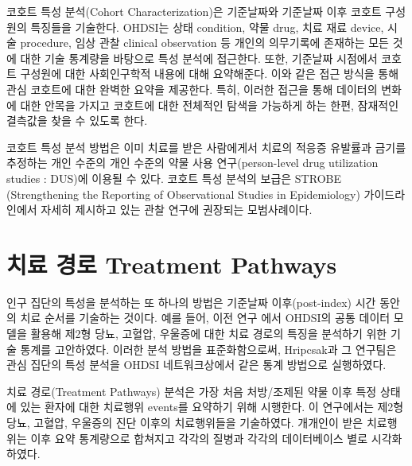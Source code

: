 \documentclass[11pt]{book}
\theoremstyle{definition}
\theoremstyle{definition}
\theoremstyle{definition}
\theoremstyle{remark}
\begin{document}
코호트 특성 분석(Cohort Characterization)은 기준날짜와 기준날짜 이후
코호트 구성원의 특징들을 기술한다. OHDSI는 상태 condition, 약물 drug,
치료 재료 device, 시술 procedure, 임상 관찰 clinical observation 등
개인의 의무기록에 존재하는 모든 것에 대한 기술 통계량을 바탕으로 특성
분석에 접근한다. 또한, 기준날짜 시점에서 코호트 구성원에 대한
사회인구학적 내용에 대해 요약해준다. 이와 같은 접근 방식을 통해 관심
코호트에 대한 완벽한 요약을 제공한다. 특히, 이러한 접근을 통해 데이터의
변화에 대한 안목을 가지고 코호트에 대한 전체적인 탐색을 가능하게 하는
한편, 잠재적인 결측값을 찾을 수 있도록 한다.

코호트 특성 분석 방법은 이미 치료를 받은 사람에게서 치료의 적응증
유발률과 금기를 추정하는 개인 수준의 개인 수준의 약물 사용
연구(person-level drug utilization studies : DUS)에 이용될 수 있다.
코호트 특성 분석의 보급은 STROBE (Strengthening the Reporting of
Observational Studies in Epidemiology) 가이드라인에서 자세히 제시하고
있는 관찰 연구에 권장되는 모범사례이다. \citep{VONELM2008344}

\section{치료 경로 Treatment Pathways}\label{--treatment-pathways}

인구 집단의 특성을 분석하는 또 하나의 방법은 기준날짜 이후(post-index)
시간 동안의 치료 순서를 기술하는 것이다. 예를 들어, 이전 연구
\citep{Hripcsak7329} 에서 OHDSI의 공통 데이터 모델을 활용해 제2형 당뇨,
고혈압, 우울증에 대한 치료 경로의 특징을 분석하기 위한 기술 통계를
고안하였다. 이러한 분석 방법을 표준화함으로써, Hripcsak과 그 연구팀은
관심 집단의 특성 분석을 OHDSI 네트워크상에서 같은 통계 방법으로
실행하였다. 

치료 경로(Treatment Pathways) 분석은 가장 처음 처방/조제된 약물 이후
특정 상태에 있는 환자에 대한 치료행위 events를 요약하기 위해 시행한다.
이 연구에서는 제2형 당뇨, 고혈압, 우울증의 진단 이후의 치료행위들을
기술하였다. 개개인이 받은 치료행위는 이후 요약 통계량으로 합쳐지고
각각의 질병과 각각의 데이터베이스 별로 시각화하였다.
\end{document}
